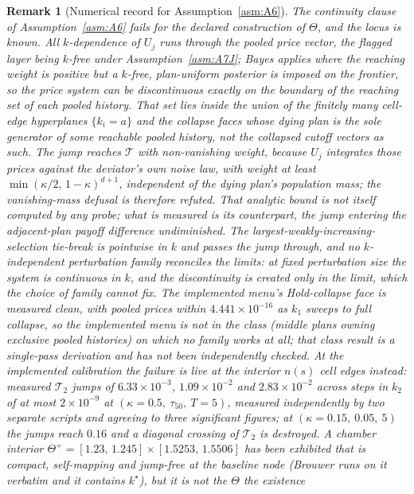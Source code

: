 \documentclass[11pt]{article}
\newtheorem{remark}{Remark}
\newcommand{\Tmap}{\mathcal{T}}
\begin{document}
\begin{remark}[Numerical record for Assumption~\ref{asm:A6}]
\label{rem:A6record}
The continuity clause of Assumption~\ref{asm:A6} fails for the declared construction of $\Theta$,
and the locus is known. All $k$-dependence of $U_j$ runs through the pooled price vector, the
flagged layer being $k$-free under Assumption~\ref{asm:A7J}; Bayes applies where the reaching weight
is positive but a $k$-free, plan-uniform posterior is imposed on the frontier, so the price system
can be discontinuous exactly on the boundary of the reaching set of each pooled history. That set
lies inside the union of the finitely many \emph{cell-edge hyperplanes} $\{k_i = a\}$ and the
\emph{collapse faces whose dying plan is the sole generator} of some reachable pooled history,
not the collapsed cutoff vectors as such. The jump reaches $\Tmap$ with non-vanishing weight,
because $U_j$ integrates those prices against the deviator's own noise law, with weight at least
$\min(\kappa/2,\,1-\kappa)^{d+1}$, independent of the dying plan's population mass; the
vanishing-mass defusal is therefore refuted. That analytic bound is not itself computed by any
probe; what is measured is its counterpart, the jump entering the adjacent-plan payoff difference
undiminished. The largest-weakly-increasing-selection tie-break is
pointwise in $k$ and passes the jump through, and no $k$-independent perturbation family reconciles
the limits: at fixed perturbation size the system is continuous in $k$, and the discontinuity is
created only in the limit, which the choice of family cannot fix. The implemented menu's
Hold-collapse face is measured clean, with pooled prices within $4.441\times10^{-16}$ as $k_1$ sweeps
to full collapse, so the implemented menu is not in the class (middle plans owning exclusive
pooled histories) on which no family works at all; that class result is a single-pass derivation
and has not been independently checked. At the implemented calibration the failure is
live at the interior $n(s)$ cell edges instead: measured $\Tmap_2$ jumps of $6.33\times10^{-3}$,
$1.09\times10^{-2}$ and $2.83\times10^{-2}$ across steps in $k_2$ of at most $2\times10^{-9}$ at
$(\kappa = 0.5,\ \tau_{50},\ T = 5)$, measured independently by two separate scripts and agreeing to
three significant figures; at $(\kappa = 0.15,\ 0.05,\ 5)$ the jumps reach $0.16$ and a diagonal
crossing of $\Tmap_2$ is destroyed. A chamber interior $\Theta^+ = [1.23,\,1.245]\times[1.5253,\,
1.5506]$ has been exhibited that is compact, self-mapping and jump-free at the baseline node
(Brouwer runs on it verbatim and it contains $k^\star$), but it is not the $\Theta$ the existence

\end{remark}
\end{document}
